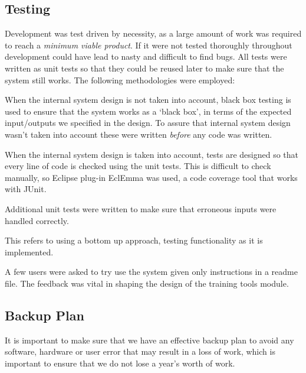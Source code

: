\documentclass[12pt,twoside,notitlepage]{report}
\begin{document}
        \subsection{Testing}
            Development was test driven by necessity, as a large amount of work was required to reach a 
            \textit{minimum viable product}. If it were not tested thoroughly throughout development could have lead 
            to nasty and difficult to find bugs. All tests were written as unit tests so that 
            they could be reused later to make sure that the system still works.
            The following methodologies were employed:
            \begin{description}[font=\normalfont\itshape, labelindent=10pt]
                \item[Black box testing:] When the internal system design is not taken into account, black box testing is 
                    used to ensure that the system works as a `black box', in terms of the expected 
                    input/outputs we specified in the design. To assure that internal system design wasn't taken 
                    into account these were written \textit{before} any code was written.
                \item[White box testing:] When the internal system design is taken into account, tests are designed so that every 
                    line of code is checked using the unit tests. This is difficult to check manually, so Eclipse plug-in 
                    EclEmma was used, a code coverage tool that works with JUnit.
                \item[Input sanitisation testing:] Additional unit tests were written to make sure that erroneous inputs 
                    were handled correctly.
                \item[Incremental integration testing:] This refers to using a bottom up approach, testing functionality 
                    as it is implemented.
                \item[Usability testing:] A few users were asked to try use the system given only instructions in a readme 
                    file. The feedback was vital in shaping the design of the training tools module.
            \end{description}

        \subsection{Backup Plan}
            It is important to make sure that we have an effective backup plan to avoid any software, hardware or 
            user error that may result in a loss of work, which is important to ensure that we do not 
            lose a year's worth of work. 
\end{document}

